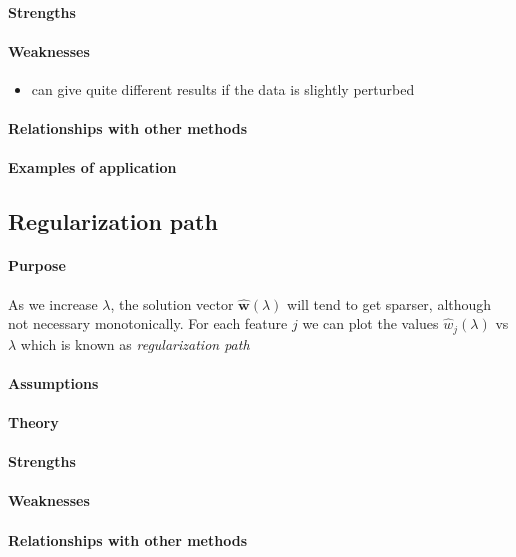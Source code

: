 \paragraph{Strengths}

\paragraph{Weaknesses}
\begin{itemize}
    \item can give quite different results if the data is slightly perturbed
\end{itemize}
\paragraph{Relationships with other methods}
\paragraph{Examples of application}

\subsection{Regularization path}
\paragraph{Purpose}
As we increase $\lambda$, the solution vector $\hat{\bm{w}}(\lambda)$ will tend to get
sparser, although not necessary monotonically. For each feature $j$ we can plot the 
values $\hat{w}_{j}(\lambda)$ vs $\lambda$ which is known as \emph{regularization path}
\paragraph{Assumptions}
\paragraph{Theory}
\paragraph{Strengths}
\paragraph{Weaknesses}
\paragraph{Relationships with other methods}
